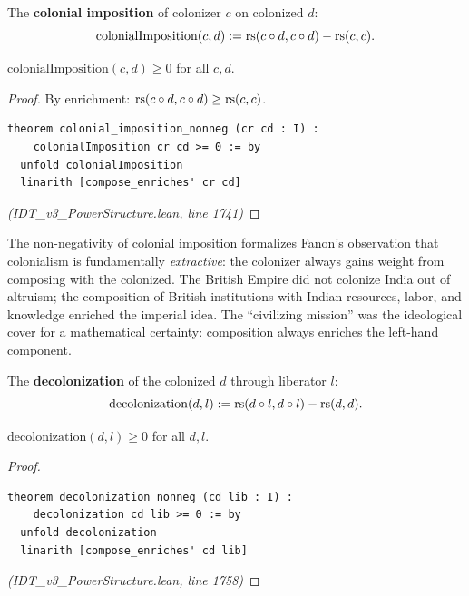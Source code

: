 \begin{definition}
\label{def:colonial-imposition}
The \textbf{colonial imposition} of colonizer $c$ on colonized $d$:
\[
  \mathrm{colonialImposition}(c, d) := \mathrm{rs}(c \circ d, c \circ d) - \mathrm{rs}(c, c).
\]
\end{definition}

\begin{theorem}
\label{thm:colonial-nonneg}
$\mathrm{colonialImposition}(c, d) \geq 0$ for all $c, d$.
\end{theorem}

\begin{proof}
By enrichment: $\mathrm{rs}(c \circ d, c \circ d) \geq \mathrm{rs}(c,c)$.
\begin{lstlisting}
theorem colonial_imposition_nonneg (cr cd : I) :
    colonialImposition cr cd >= 0 := by
  unfold colonialImposition
  linarith [compose_enriches' cr cd]
\end{lstlisting}
\textit{(IDT\_v3\_PowerStructure.lean, line 1741)}
\end{proof}

\begin{interpretation}
The non-negativity of colonial imposition formalizes Fanon's observation that
colonialism is fundamentally \emph{extractive}: the colonizer always gains
weight from composing with the colonized. The British Empire did not colonize
India out of altruism; the composition of British institutions with Indian
resources, labor, and knowledge enriched the imperial idea. The ``civilizing
mission'' was the ideological cover for a mathematical certainty: composition
always enriches the left-hand component.
\end{interpretation}

\begin{definition}[Decolonization]
\label{def:decolonization}
The \textbf{decolonization} of the colonized $d$ through liberator $l$:
\[
  \mathrm{decolonization}(d, l) := \mathrm{rs}(d \circ l, d \circ l) - \mathrm{rs}(d, d).
\]
\end{definition}

\begin{theorem}
\label{thm:decolonization-nonneg}
$\mathrm{decolonization}(d, l) \geq 0$ for all $d, l$.
\end{theorem}

\begin{proof}
\begin{lstlisting}
theorem decolonization_nonneg (cd lib : I) :
    decolonization cd lib >= 0 := by
  unfold decolonization
  linarith [compose_enriches' cd lib]
\end{lstlisting}
\textit{(IDT\_v3\_PowerStructure.lean, line 1758)}
\end{proof}

